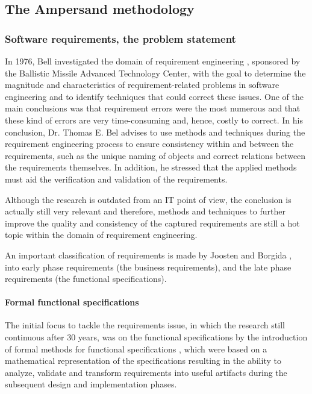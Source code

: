 
\subsection{The Ampersand methodology}
\label{sec:AmpersandTheory}

\subsubsection{Software requirements, the problem statement}

In 1976, Bell investigated the domain of requirement engineering , sponsored by the Ballistic Missile Advanced Technology Center, with the goal to determine the magnitude and characteristics of requirement-related problems in software engineering and to identify techniques that could correct these issues. 
One of the main conclusions was that requirement errors were the most numerous and that these kind of errors are very time-consuming and, hence, costly to correct.
In his conclusion, Dr. Thomas E. Bel advises to use methods and techniques during the requirement engineering process to ensure consistency within and  between the requirements, such as the unique naming of objects and correct relations between the requirements themselves.
In addition, he stressed that the applied methods must aid the verification and validation of the requirements.
 
Although the research is outdated from an IT point of view, the conclusion is actually still very relevant and therefore, methods and techniques to further improve the quality and consistency of the captured requirements are still a hot topic within the domain of requirement engineering.

An important classification of requirements is made by Joosten  and Borgida , into early phase requirements (the business requirements), and the late phase requirements (the functional specifications). 

\paragraph{Formal functional specifications}
The initial focus to tackle the requirements issue, in which the research still continuous after 30 years, was on the functional specifications by the introduction of formal methods for functional specifications , which were based on a mathematical representation of the specifications resulting in the ability to analyze, validate and transform requirements into useful artifacts during the subsequent design and implementation phases. 

